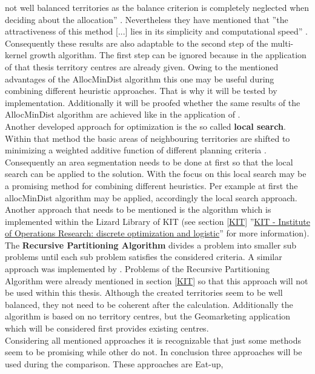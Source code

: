 not well balanced territories as the balance criterion is completely neglected when deciding about the allocation'' \cite{kalcsics2}. Nevertheless they have mentioned that ''the attractiveness of this method [...] lies in its simplicity and computational speed'' \cite{kalcsics2}. Consequently these results are also adaptable to the second step of the multi-kernel growth algorithm. The first step can be ignored because in the application of that thesis territory centres are already given. Owing to the mentioned advantages of the AllocMinDist algorithm this one may be useful during combining different heuristic approaches. That is why it will be tested by implementation. Additionally it will be proofed whether the same results of the AllocMinDist algorithm are achieved like in the application of \citeauthor{kalcsics2}. \\
Another developed approach for optimization is the so called \textbf{local search}. Within that method the basic areas of neighbouring territories are shifted to minimizing a weighted additive function of different planning criteria \cite{kalcsics}. Consequently an area segmentation needs to be done at first so that the local search can be applied to the solution. With the focus on this local search may be a promising method for combining different heuristics. Per example at first the allocMinDist algorithm may be applied, accordingly the local search approach. \\
Another approach that needs to be mentioned is the algorithm which is implemented within the Lizard Library of KIT (see section \ref{KIT} ''\hyperref[KIT]{KIT - Institute of Operations Research: discrete optimization and logistic}'' for more information). The \textbf{Recursive Partitioning Algorithm} divides a problem into smaller sub problems until each sub problem satisfies the considered criteria. A similar approach was implemented by \citeauthor{forrest} \cite{forrest}. Problems of the Recursive Partitioning Algorithm were already mentioned in section \ref{KIT} so that this approach will not be used within this thesis. Although the created territories seem to be well balanced, they not need to be coherent after the calculation. Additionally the algorithm is based on no territory centres, but the Geomarketing application which will be considered first provides existing centres. \\
Considering all mentioned approaches it is recognizable that just some methods seem to be promising while other do not. In conclusion three approaches will be used during the comparison. These approaches are Eat-up,
